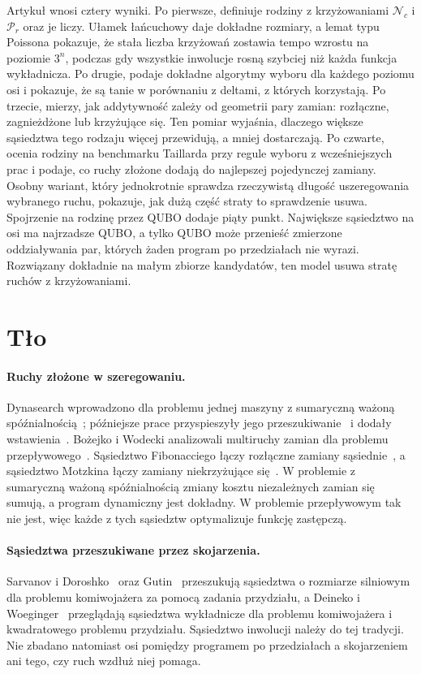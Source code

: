\documentclass[10pt,twocolumn]{article}
\newcommand{\N}{\mathcal{N}}
\newcommand{\Pa}{\mathcal{P}}
\begin{document}
Artykuł wnosi cztery wyniki. Po pierwsze, definiuje rodziny z krzyżowaniami
$\N_c$ i $\Pa_r$ oraz je liczy. Ułamek łańcuchowy daje dokładne rozmiary,
a lemat typu Poissona pokazuje, że stała liczba krzyżowań zostawia tempo
wzrostu na poziomie $3^n$, podczas gdy wszystkie inwolucje rosną szybciej
niż każda funkcja wykładnicza. Po drugie, podaje dokładne algorytmy wyboru
dla każdego poziomu osi i pokazuje, że są tanie w porównaniu z deltami,
z których korzystają. Po trzecie, mierzy, jak addytywność zależy od
geometrii pary zamian: rozłączne, zagnieżdżone lub krzyżujące się. Ten
pomiar wyjaśnia, dlaczego większe sąsiedztwa tego rodzaju więcej
przewidują, a mniej dostarczają. Po czwarte, ocenia rodziny na
benchmarku Taillarda przy regule wyboru z wcześniejszych prac
i podaje, co ruchy złożone dodają do najlepszej pojedynczej zamiany.
Osobny wariant, który jednokrotnie sprawdza rzeczywistą długość
uszeregowania wybranego ruchu, pokazuje, jak dużą część straty to
sprawdzenie usuwa. Spojrzenie na rodzinę przez QUBO dodaje piąty punkt.
Największe sąsiedztwo na osi ma najrzadsze QUBO, a tylko QUBO może
przenieść zmierzone oddziaływania par, których żaden program po
przedziałach nie wyrazi. Rozwiązany dokładnie na małym zbiorze kandydatów,
ten model usuwa stratę ruchów z krzyżowaniami.

\section{Tło}

\paragraph{Ruchy złożone w szeregowaniu.} Dynasearch wprowadzono dla
problemu jednej maszyny z sumaryczną ważoną spóźnialnością~\cite{congram2002};
późniejsze prace przyspieszyły jego przeszukiwanie~\cite{ergun2006}
i dodały wstawienia~\cite{grosso2004}. Bo\.zejko i Wodecki analizowali
multiruchy zamian dla problemu przepływowego~\cite{bozejko2007}.
Sąsiedztwo Fibonacciego łączy rozłączne zamiany sąsiednie~\cite{fibonacci_own,bozejko2026sr},
a sąsiedztwo Motzkina łączy zamiany niekrzyżujące się~\cite{motzkin_own}.
W problemie z sumaryczną ważoną spóźnialnością zmiany kosztu niezależnych
zamian się sumują, a program dynamiczny jest dokładny. W problemie
przepływowym tak nie jest, więc każde z tych sąsiedztw optymalizuje
funkcję zastępczą.

\paragraph{Sąsiedztwa przeszukiwane przez skojarzenia.} Sarvanov
i Doroshko~\cite{sarvanov1981} oraz Gutin~\cite{gutin1999} przeszukują
sąsiedztwa o rozmiarze silniowym dla problemu komiwojażera za pomocą
zadania przydziału, a Deineko i Woeginger~\cite{deineko2000} przeglądają
sąsiedztwa wykładnicze dla problemu komiwojażera i kwadratowego problemu
przydziału. Sąsiedztwo inwolucji należy do tej tradycji. Nie zbadano
natomiast osi pomiędzy programem po przedziałach a skojarzeniem ani tego,
czy ruch wzdłuż niej pomaga.
\end{document}
